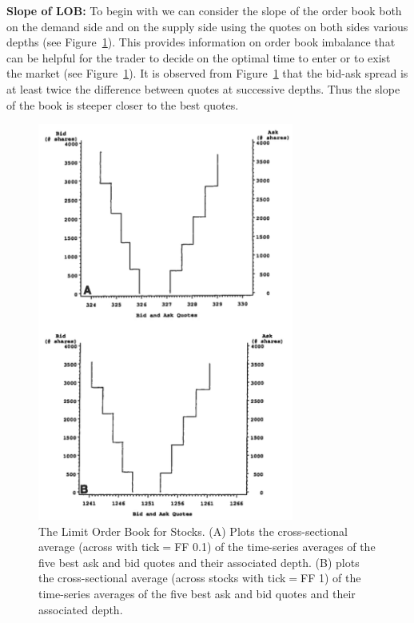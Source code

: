 \noindent \textbf{Slope of LOB:} To begin with we can consider the slope of the order book both on the demand side and on the supply side using the quotes on both sides various depths (see Figure~\ref{fig:limitstocks}). This provides information on order book imbalance that can be helpful for the trader to decide on the optimal time to enter or to exist the market (see Figure~\ref{fig:limitstocks}). It is observed from Figure~\ref{fig:limitstocks} that the bid-ask spread is at least twice the difference between quotes at successive depths. Thus the slope of the book is steeper closer to the best quotes. \\
	\begin{figure}[!ht]
	   \centering
	   \includegraphics[width=0.75\textwidth]{chapters/chapter_trade_data_models/figures/limitstocks.png} 
	\caption{The Limit Order Book for Stocks. (A) Plots the cross-sectional average (across with tick$=$FF 0.1) of the time-series averages of the five best ask and bid quotes and their associated depth. (B) plots the cross-sectional average (across stocks with tick$=$FF 1) of the time-series averages of the five best ask and bid quotes and their associated depth.\label{fig:limitstocks}}
	\end{figure}

